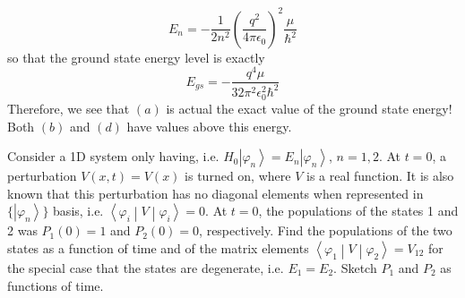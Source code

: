 \documentclass[a4paper, 11pt]{article}
\newcommand{\ket}[1]{\ensuremath{\left|#1\right\rangle}}
\newcommand{\matrixel}[3]{\ensuremath{\left\langle #1 \middle| #2 \middle| #3 \right\rangle}}
\newenvironment{solution}{%
	\begin{list}{}{%
			\setlength{\topsep}{0pt}%
			\setlength{\leftmargin}{0.5cm}%
			\setlength{\rightmargin}{0.5cm}%
			\setlength{\listparindent}{\parindent}%
			\setlength{\itemindent}{\parindent}%
			\setlength{\parsep}{\parskip}%
		}%
		\item[]}{\end{list}}
\begin{document}
\begin{enumerate}[leftmargin=0em, label=\textbf{\arabic*}]
\begin{solution}
\begin{equation}
        E_n = -\frac{1}{2n^2}\left( \frac{q^2}{4\pi\epsilon_0} \right)^2\frac{\mu}{\hbar^2}
      \end{equation}
      so that the ground state energy level is exactly
      \begin{equation}
        E_{gs} = -\frac{q^4\mu}{32\pi^2\epsilon_0^2\hbar^2}
      \end{equation}
      Therefore, we see that $(a)$ is actual the exact value of the ground state
      energy! Both $(b)$ and $(d)$ have values above this energy. 
    \end{solution}







  
  \item Consider a 1D system only having, i.e.
    $H_0\ket{\varphi_n}=E_n\ket{\varphi_n}$, $n=1,2$. At $t=0$, a perturbation
    $V(x,t)=V(x)$ is turned on, where $V$ is a real function. It is also known
    that this perturbation has no diagonal elements when represented in
    $\{\ket{\varphi_n}\}$ basis, i.e. $\matrixel{\varphi_i}{V}{\varphi_i}=0$. At
    $t=0$, the populations of the states 1 and 2 was $P_1(0)=1$ and $P_2(0)=0$,
    respectively. Find the populations of the two states as a function of time
    and of the matrix elements $\matrixel{\varphi_1}{V}{\varphi_2} = V_{12}$ for
    the special case that the states are degenerate, i.e. $E_1 = E_2$. Sketch
    $P_1$ and $P_2$ as functions of time.  \\


\end{enumerate}
\end{document}
